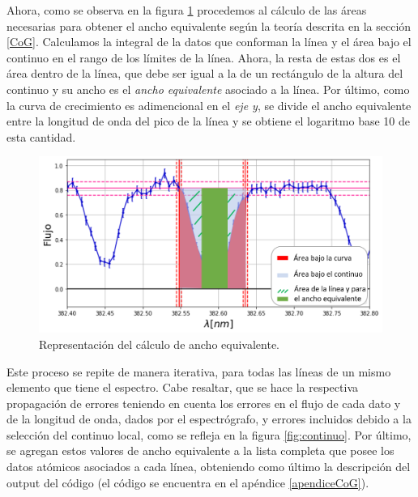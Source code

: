 \documentclass[12pt,oneside,openany,letter]{book}
\begin{document}
Ahora, como se observa en la figura \ref{fig:anchoeq_} procedemos al cálculo de las áreas necesarias para obtener el ancho equivalente según la teoría descrita en la sección \ref{CoG}. Calculamos la integral de la datos que conforman la línea y el área bajo el continuo en el rango de los límites de la línea. Ahora, la resta de estas dos es el área dentro de la línea, que debe ser igual a la de un rectángulo de la altura del continuo y su ancho es el \textit{ancho equivalente} asociado a la línea. Por último, como la curva de crecimiento es adimencional en el \textit{eje y}, se divide el ancho equivalente entre la longitud de onda del pico de la línea y se obtiene el logaritmo base 10 de esta cantidad.

\begin{figure}[h]
    \centering
    \includegraphics[width=1\linewidth]{Gaficas/ancho_eq.png}
    \caption{Representación del cálculo de ancho equivalente.}
    \label{fig:anchoeq_}
\end{figure}

Este proceso se repite de manera iterativa, para todas las líneas de un mismo elemento que tiene el espectro. Cabe resaltar, que se hace la respectiva propagación de errores teniendo en cuenta los errores en el flujo de cada dato y de la longitud de onda, dados por el espectrógrafo, y errores incluidos debido a la selección del continuo local, como se refleja en la figura \ref{fig:continuo}. Por último, se agregan estos valores de ancho equivalente a la lista completa que posee los datos atómicos asociados a cada línea, obteniendo como último la descripción del output del código (el código se encuentra en el apéndice \ref{apendiceCoG}).
\end{document}
